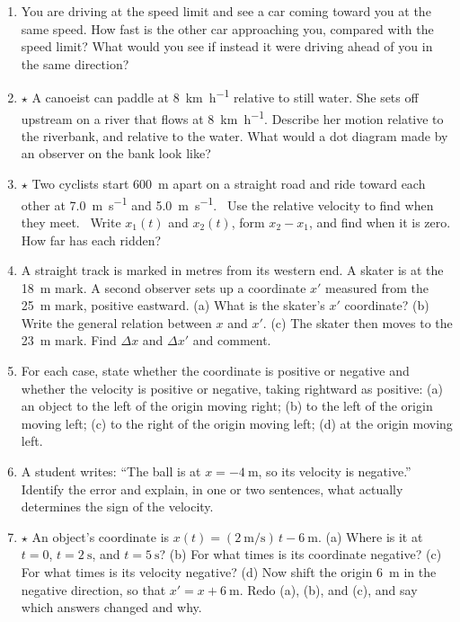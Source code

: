 \documentclass[11pt,twoside,openany]{book}
\newcommand{\viewtag}[3]{\fcolorbox{#2}{#3}{\footnotesize\textbf{\textcolor{#2}{#1}}}}
\newcommand{\elemtag}{\viewtag{Elementary}{elemcol}{elempale}}
\newcommand{\calctag}{\viewtag{Calculus}{calccol}{calcpale}}
\begin{document}
\begin{enumerate}[label=\textbf{\thechapter.\arabic*},resume=exercises,leftmargin=*]
  \item You are driving at the speed limit and see a car coming toward you at the same speed. How fast is the other car approaching you, compared with the speed limit? What would you see if instead it were driving ahead of you in the same direction?
  \item $\star$ A canoeist can paddle at \SI{8}{\kilo\metre\per\hour} relative to still water. She sets off upstream on a river that flows at \SI{8}{\kilo\metre\per\hour}. Describe her motion relative to the riverbank, and relative to the water. What would a dot diagram made by an observer on the bank look like?
  \item $\star$ Two cyclists start \SI{600}{\metre} apart on a straight road and ride toward each other at \SI{7.0}{\metre\per\second} and \SI{5.0}{\metre\per\second}. \elemtag\ Use the relative velocity to find when they meet. \calctag\ Write $x_1(t)$ and $x_2(t)$, form $x_2 - x_1$, and find when it is zero. How far has each ridden?
  \item A straight track is marked in metres from its western end. A skater is at the \SI{18}{\metre} mark. A second observer sets up a coordinate $x'$ measured from the \SI{25}{\metre} mark, positive eastward. (a) What is the skater's $x'$ coordinate? (b) Write the general relation between $x$ and $x'$. (c) The skater then moves to the \SI{23}{\metre} mark. Find $\Delta x$ and $\Delta x'$ and comment.
  \item For each case, state whether the coordinate is positive or negative and whether the velocity is positive or negative, taking rightward as positive: (a) an object to the left of the origin moving right; (b) to the left of the origin moving left; (c) to the right of the origin moving left; (d) at the origin moving left.
  \item A student writes: ``The ball is at $x = \SI{-4}{\metre}$, so its velocity is negative.'' Identify the error and explain, in one or two sentences, what actually determines the sign of the velocity.
  \item $\star$ An object's coordinate is $x(t) = (\SI{2}{\metre\per\second})\,t - \SI{6}{\metre}$. (a) Where is it at $t=0$, $t=\SI{2}{\second}$, and $t=\SI{5}{\second}$? (b) For what times is its coordinate negative? (c) For what times is its velocity negative? (d) Now shift the origin \SI{6}{\metre} in the negative direction, so that $x' = x + \SI{6}{\metre}$. Redo (a), (b), and (c), and say which answers changed and why.\label{ex:shiftorigin}
\end{enumerate}
\end{document}
